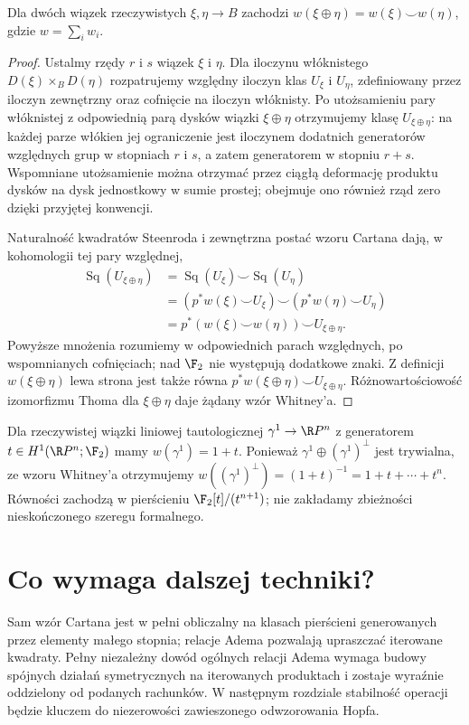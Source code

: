 \begin{wniosek}
Dla dwóch wiązek rzeczywistych $\xi,\eta\to B$
zachodzi $w(\xi\oplus\eta)=w(\xi)\smile w(\eta)$,
gdzie $w=\sum_iw_i$.
\end{wniosek}
\begin{proof}
Ustalmy rzędy $r$ i $s$ wiązek $\xi$ i $\eta$.
Dla iloczynu włóknistego $D(\xi)\times_B D(\eta)$
rozpatrujemy względny iloczyn klas
$U_\xi$ i $U_\eta$, zdefiniowany przez
iloczyn zewnętrzny oraz cofnięcie na iloczyn
włóknisty. Po utożsamieniu pary włóknistej
z odpowiednią parą dysków wiązki
$\xi\oplus\eta$ otrzymujemy klasę
$U_{\xi\oplus\eta}$: na każdej parze włókien
jej ograniczenie jest iloczynem dodatnich
generatorów względnych grup w stopniach
$r$ i $s$, a zatem generatorem w stopniu
$r+s$. Wspomniane utożsamienie można
otrzymać przez ciągłą deformację produktu
dysków na dysk jednostkowy w sumie prostej;
obejmuje ono również rząd zero dzięki
przyjętej konwencji.

Naturalność kwadratów Steenroda i zewnętrzna
postać wzoru Cartana dają, w kohomologii
tej pary względnej,
\[
\begin{aligned}
\operatorname{Sq}(U_{\xi\oplus\eta})
 &=\operatorname{Sq}(U_\xi)\smile
   \operatorname{Sq}(U_\eta)\\
 &=(p^*w(\xi)\smile U_\xi)\smile
   (p^*w(\eta)\smile U_\eta)\\
 &=p^*(w(\xi)\smile w(\eta))
   \smile U_{\xi\oplus\eta}.
\end{aligned}
\]
Powyższe mnożenia rozumiemy w odpowiednich
parach względnych, po wspomnianych cofnięciach;
nad $\F_2$ nie występują dodatkowe znaki.
Z definicji $w(\xi\oplus\eta)$ lewa strona
jest także równa
$p^*w(\xi\oplus\eta)\smile U_{\xi\oplus\eta}$.
Różnowartościowość izomorfizmu Thoma dla
$\xi\oplus\eta$ daje żądany wzór Whitney'a.
\end{proof}

\begin{przyklad}
Dla rzeczywistej wiązki liniowej tautologicznej
$\gamma^1\to\R P^n$ z generatorem
$t\in H^1(\R P^n;\F_2)$ mamy $w(\gamma^1)=1+t$.
Ponieważ $\gamma^1\oplus(\gamma^1)^\perp$ jest trywialna,
ze wzoru Whitney'a otrzymujemy
$w((\gamma^1)^\perp)=(1+t)^{-1}=1+t+\cdots+t^n$.
Równości zachodzą w pierścieniu
$\F_2[t]/(t^{n+1})$; nie zakładamy zbieżności
nieskończonego szeregu formalnego.
\end{przyklad}

\section{Co wymaga dalszej techniki?}
Sam wzór Cartana jest w pełni obliczalny na klasach
pierścieni generowanych przez elementy małego stopnia;
relacje Adema pozwalają upraszczać iterowane kwadraty.
Pełny niezależny dowód ogólnych relacji Adema wymaga
budowy spójnych działań symetrycznych na iterowanych
produktach i zostaje wyraźnie oddzielony od podanych
rachunków. W następnym rozdziale stabilność operacji
będzie kluczem do niezerowości zawieszonego odwzorowania Hopfa.
